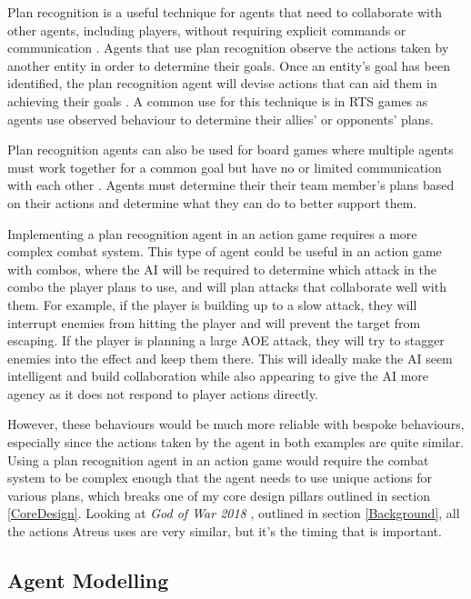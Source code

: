 \documentclass{IEEEtran}
\begin{document}
Plan recognition is a useful technique for agents that need to collaborate with other agents, including players, without requiring explicit commands or communication \cite{GeneratingCollabBehaviourPlanRecognition2016, PandemicPlanRecognition2021}. Agents that use plan recognition observe the actions taken by another entity in order to determine their goals. Once an entity’s goal has been identified, the plan recognition agent will devise actions that can aid them in achieving their goals \cite{GeneratingCollabBehaviourPlanRecognition2016}. A common use for this technique is in RTS games \cite{PlayerAdaptiveRTSAI2007} as agents use observed behaviour to determine their allies' or opponents' plans.

Plan recognition agents can also be used for board games where multiple agents must work together for a common goal but have no or limited communication with each other \cite{PandemicPlanRecognition2021}. Agents must determine their their team member's plans based on their actions and determine what they can do to better support them.

Implementing a plan recognition agent in an action game requires a more complex combat system. This type of agent could be useful in an action game with combos, where the AI will be required to determine which attack in the combo the player plans to use, and will plan attacks that collaborate well with them. For example, if the player is building up to a slow attack, they will interrupt enemies from hitting the player and will prevent the target from escaping. If the player is planning a large AOE attack, they will try to stagger enemies into the effect and keep them there. This will ideally make the AI seem intelligent and build collaboration while also appearing to give the AI more agency as it does not respond to player actions directly.

However, these behaviours would be much more reliable with bespoke behaviours, especially since the actions taken by the agent in both examples are quite similar. Using a plan recognition agent in an action game would require the combat system to be complex enough that the agent needs to use unique actions for various plans, which breaks one of my core design pillars outlined in section \ref{CoreDesign}. Looking at \textit{God of War 2018} \cite{GDCAtreus}, outlined in section \ref{Background}, all the actions Atreus uses are very similar, but it’s the timing that is important.

\subsection{Agent Modelling}
\label{AgentModelling}
\end{document}
